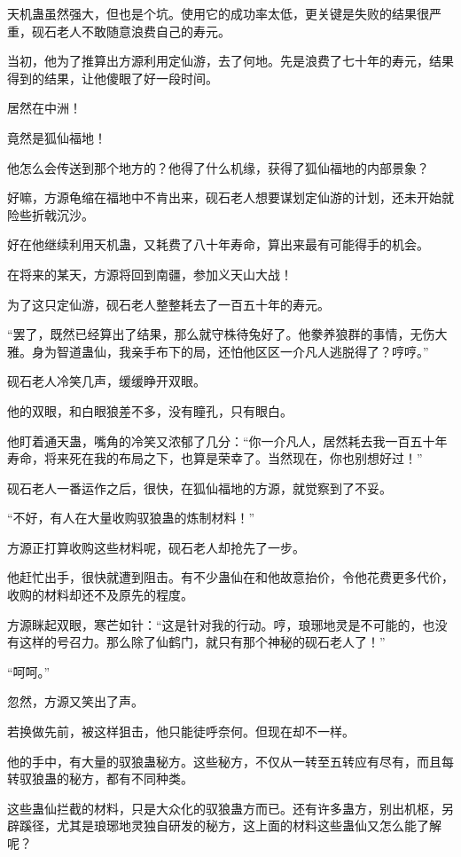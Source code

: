\begin{this_body}
天机蛊虽然强大，但也是个坑。使用它的成功率太低，更关键是失败的结果很严重，砚石老人不敢随意浪费自己的寿元。

当初，他为了推算出方源利用定仙游，去了何地。先是浪费了七十年的寿元，结果得到的结果，让他傻眼了好一段时间。

居然在中洲！

竟然是狐仙福地！

他怎么会传送到那个地方的？他得了什么机缘，获得了狐仙福地的内部景象？

好嘛，方源龟缩在福地中不肯出来，砚石老人想要谋划定仙游的计划，还未开始就险些折戟沉沙。

好在他继续利用天机蛊，又耗费了八十年寿命，算出来最有可能得手的机会。

在将来的某天，方源将回到南疆，参加义天山大战！

为了这只定仙游，砚石老人整整耗去了一百五十年的寿元。

“罢了，既然已经算出了结果，那么就守株待兔好了。他豢养狼群的事情，无伤大雅。身为智道蛊仙，我亲手布下的局，还怕他区区一介凡人逃脱得了？哼哼。”

砚石老人冷笑几声，缓缓睁开双眼。

他的双眼，和白眼狼差不多，没有瞳孔，只有眼白。

他盯着通天蛊，嘴角的冷笑又浓郁了几分：“你一介凡人，居然耗去我一百五十年寿命，将来死在我的布局之下，也算是荣幸了。当然现在，你也别想好过！”

砚石老人一番运作之后，很快，在狐仙福地的方源，就觉察到了不妥。

“不好，有人在大量收购驭狼蛊的炼制材料！”

方源正打算收购这些材料呢，砚石老人却抢先了一步。

他赶忙出手，很快就遭到阻击。有不少蛊仙在和他故意抬价，令他花费更多代价，收购的材料却还不及原先的程度。

方源眯起双眼，寒芒如针：“这是针对我的行动。哼，琅琊地灵是不可能的，也没有这样的号召力。那么除了仙鹤门，就只有那个神秘的砚石老人了！”

“呵呵。”

忽然，方源又笑出了声。

若换做先前，被这样狙击，他只能徒呼奈何。但现在却不一样。

他的手中，有大量的驭狼蛊秘方。这些秘方，不仅从一转至五转应有尽有，而且每转驭狼蛊的秘方，都有不同种类。

这些蛊仙拦截的材料，只是大众化的驭狼蛊方而已。还有许多蛊方，别出机枢，另辟蹊径，尤其是琅琊地灵独自研发的秘方，这上面的材料这些蛊仙又怎么能了解呢？

\end{this_body}

